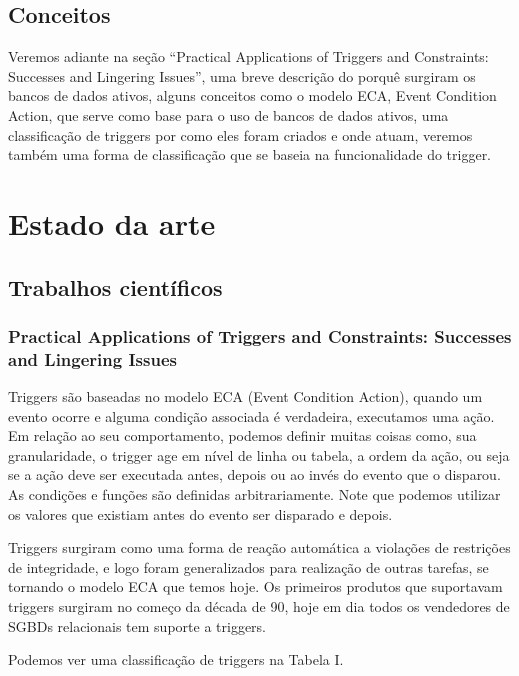 \documentclass[conference]{IEEEtran}
\begin{document}
  \subsection{Conceitos}
	Veremos adiante na seção “Practical Applications of Triggers and Constraints: Successes and Lingering Issues”, uma breve descrição do porquê surgiram os bancos de dados ativos, alguns conceitos como o modelo ECA, Event Condition Action, que serve como base para o uso de bancos de dados ativos, uma classificação de triggers por como eles foram criados e onde atuam, veremos também uma forma de classificação que se baseia na funcionalidade do trigger. 

\section{Estado da arte}
  \subsection{Trabalhos científicos}
    \subsubsection{Practical Applications of Triggers and Constraints: Successes and Lingering Issues}
    
    Triggers são baseadas no modelo ECA (Event Condition Action), quando um evento ocorre e alguma condição associada é verdadeira, executamos uma ação. Em relação ao seu comportamento, podemos definir muitas coisas como, sua granularidade, o trigger age em nível de linha ou tabela, a ordem da ação, ou seja se a ação deve ser executada antes, depois ou ao invés do evento que o disparou. As condições e funções são definidas arbitrariamente. Note que podemos utilizar os valores que existiam antes do evento ser disparado e depois.

    Triggers surgiram como uma forma de reação automática a violações de restrições de integridade, e logo foram generalizados para realização de outras tarefas, se tornando o modelo ECA que temos hoje. Os primeiros produtos que suportavam triggers surgiram no começo da década de 90, hoje em dia todos os vendedores de SGBDs relacionais tem suporte a triggers.

    Podemos ver uma classificação de triggers na Tabela I.
\end{document}
